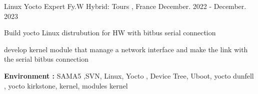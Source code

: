 \documentclass[11pt, a4paper]{awesome-cv} %
\begin{document}
\begin{cventries}
 \cventry
    {Linux Yocto Expert} %
    {Fy.W} %
    {Hybrid:  Tours , France} %
    {December. 2022 - December. 2023} %
    { %
        \begin{cvitems}
            \item {Build yocto Linux distrubution for HW with bitbus serial connection}
            \item {develop kernel module that manage a network interface and make the link with the serial bitbus connection}
            \item { \textbf{Environment :} SAMA5 ,SVN, Linux, Yocto , Device Tree, Uboot, yocto dunfell , yocto kirkstone, kernel, modules kernel}
        \end{cvitems}
    }





\end{cventries}
\end{document}
